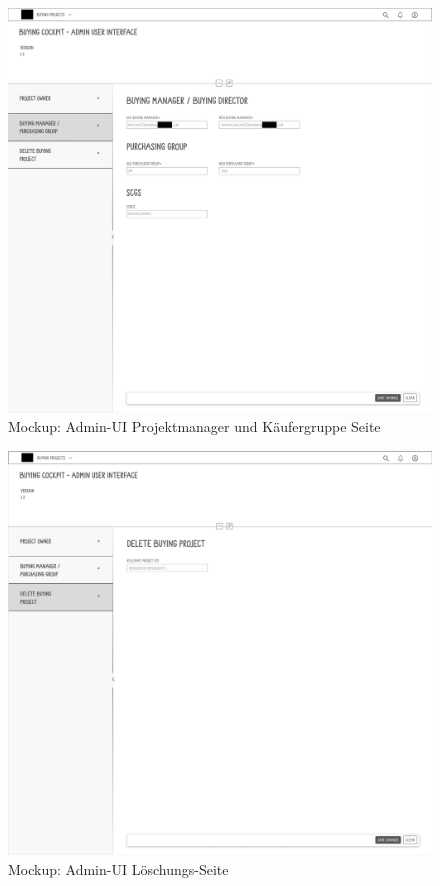 \begin{figure}[H]
    \centering
    \includegraphics[width=\linewidth]{Images/Mockup_PM_anonym.png}
    \caption[Mockup: Admin-UI Projektmanager und Käufergruppe Seite]{Mockup: Admin-UI Projektmanager und Käufergruppe Seite}
\end{figure}

\begin{figure}[H]
    \centering
    \includegraphics[width=\linewidth]{Images/Mockup_DEL_anonym.png}
    \caption[Mockup: Admin-UI Löschungs-Seite]{Mockup: Admin-UI Löschungs-Seite}
\end{figure}

